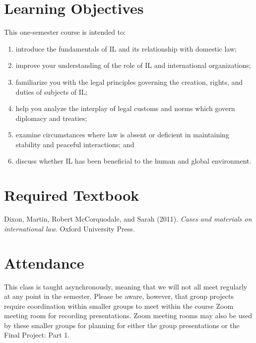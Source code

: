 \documentclass[10pt,]{article}
\providecommand{\tightlist}{%
  \setlength{\itemsep}{0pt}\setlength{\parskip}{0pt}}
\begin{document}
\hypertarget{learning-objectives}{%
\section{Learning Objectives}\label{learning-objectives}}

This one-semester course is intended to:

\begin{enumerate}
\def\labelenumi{\arabic{enumi}.}
\tightlist
\item
  introduce the fundamentals of IL and its relationship with domestic
  law;
\item
  improve your understanding of the role of IL and international
  organizations;
\item
  familiarize you with the legal principles governing the creation,
  rights, and duties of subjects of IL;
\item
  help you analyze the interplay of legal customs and norms which govern
  diplomacy and treaties;
\item
  examine circumstances where law is absent or deficient in maintaining
  stability and peaceful interactions; and
\item
  discuss whether IL has been beneficial to the human and global
  environment.
\end{enumerate}

\hypertarget{required-textbook}{%
\section{Required Textbook}\label{required-textbook}}

Dixon, Martin, Robert McCorquodale, and Sarah (2011).
\emph{Cases and materials on international law}. Oxford University
Press.

\hypertarget{attendance}{%
\section{Attendance}\label{attendance}}

This class is taught asynchronously, meaning that we will not all meet
regularly at any point in the semester. Please be aware, however, that
group projects require coordination within smaller groups to meet within
the course Zoom meeting room for recording presentations. Zoom meeting
rooms may also be used by these smaller groups for planning for either
the group presentations or the Final Project: Part 1.

\newpage
\end{document}
